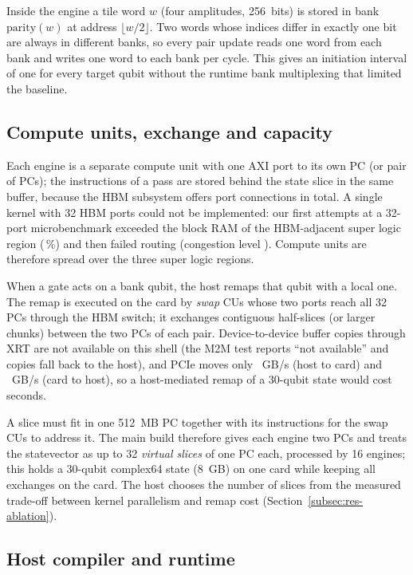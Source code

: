 Inside the engine a tile word $w$ (four amplitudes, 256~bits) is stored in bank $\mathrm{parity}(w)$ at address $\lfloor w/2\rfloor$. Two words whose indices differ in exactly one bit are always in different banks, so every pair update reads one word from each bank and writes one word to each bank per cycle. This gives an initiation interval of one for every target qubit without the runtime bank multiplexing that limited the baseline.

\subsection{Compute units, exchange and capacity}\label{subsec:cus}

Each engine is a separate compute unit with one AXI port to its own PC (or pair of PCs); the instructions of a pass are stored behind the state slice in the same buffer, because the HBM subsystem offers \NumHbmPortConnections{} port connections in total. A single kernel with 32 HBM ports could not be implemented: our first attempts at a 32-port microbenchmark exceeded the block RAM of the HBM-adjacent super logic region (\NumHbmFirstBramPct\,\%) and then failed routing (congestion level \NumHbmCongestion). Compute units are therefore spread over the three super logic regions.

When a gate acts on a bank qubit, the host remaps that qubit with a local one. The remap is executed on the card by \emph{swap} CUs whose two ports reach all 32 PCs through the HBM switch; it exchanges contiguous half-slices (or larger chunks) between the two PCs of each pair. Device-to-device buffer copies through XRT are not available on this shell (the M2M test reports ``not available'' and copies fall back to the host), and PCIe moves only \NumPcieHtoD~GB/s (host to card) and \NumPcieDtoH~GB/s (card to host), so a host-mediated remap of a 30-qubit state would cost seconds.

A slice must fit in one 512~MB PC together with its instructions for the swap CUs to address it. The main build therefore gives each engine two PCs and treats the statevector as up to 32 \emph{virtual slices} of one PC each, processed by 16 engines; this holds a 30-qubit complex64 state (8~GB) on one card while keeping all exchanges on the card. The host chooses the number of slices from the measured trade-off between kernel parallelism and remap cost (Section~\ref{subsec:res-ablation}).

\subsection{Host compiler and runtime}\label{subsec:host}


